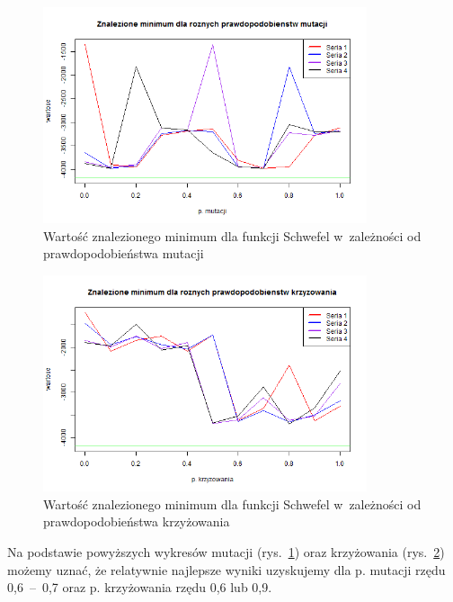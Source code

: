\documentclass[11pt, a4paper]{article}
\newcommand{\fbi}{\leavevmode{\parindent=1em\indent}}
\begin{document}
\begin{figure}[H]
	\begin{center}
		\includegraphics[width=0.85\textwidth]{./assets/Schwefel2.png}
		\caption{Wartość znalezionego minimum dla funkcji Schwefel w~zależności od prawdopodobieństwa mutacji}
		\label{fig:schwefel2}
	\end{center}
\end{figure}

\begin{figure}[H]
	\begin{center}
		\includegraphics[width=0.85\textwidth]{./assets/Schwefel3.png}
		\caption{Wartość znalezionego minimum dla funkcji Schwefel w~zależności od prawdopodobieństwa krzyżowania}
		\label{fig:schwefel3}
	\end{center}
\end{figure}

\fbi
Na podstawie powyższych wykresów mutacji (rys.~\ref{fig:schwefel2}) oraz krzyżowania (rys.~\ref{fig:schwefel3}) możemy uznać, że relatywnie najlepsze wyniki uzyskujemy dla p. mutacji rzędu 0,6~--~0,7 oraz p. krzyżowania rzędu 0,6 lub 0,9.
\end{document}
